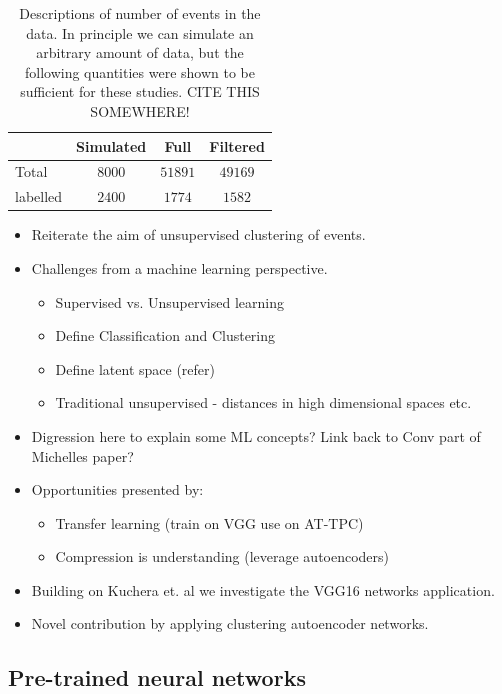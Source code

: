 \documentclass[review,number,sort&compress]{elsarticle}
\begin{document}
\begin{table}[hbtp]
\centering
\caption{Descriptions of number of events in the data. In principle we can simulate an arbitrary amount of data, but the following quantities were shown to be sufficient for these studies.{\color{blue} CITE THIS SOMEWHERE!}}\label{tab:datasets}
\begin{tabular}{lccc}
\toprule
{} & Simulated & Full & Filtered \\
\midrule
Total &  $8000$ & $51891$ & $49169$ \\
labelled & $2400$ & $1774$ &  $1582$ \\ 
\bottomrule
\end{tabular}
\end{table}

\begin{itemize}
    \item Reiterate the aim of unsupervised  clustering of events.
    \item Challenges from a machine learning perspective. 
    \begin{itemize}
        \item Supervised vs. Unsupervised learning
        \item Define Classification and Clustering 
        \item Define latent space (refer)
        \item Traditional unsupervised - distances in high dimensional spaces etc. 
    \end{itemize}
    \item Digression here to explain some ML concepts? Link back to Conv part of Michelles paper? 
    \item Opportunities presented by: 
    \begin{itemize}
        \item Transfer learning (train on VGG use on AT-TPC)
        \item Compression is understanding (leverage autoencoders) 
    \end{itemize}
    \item Building on Kuchera et. al we investigate the VGG16 networks application. 
    \item Novel contribution by applying clustering autoencoder networks. 
\end{itemize}

\subsection{Pre-trained neural networks}
\end{document}
